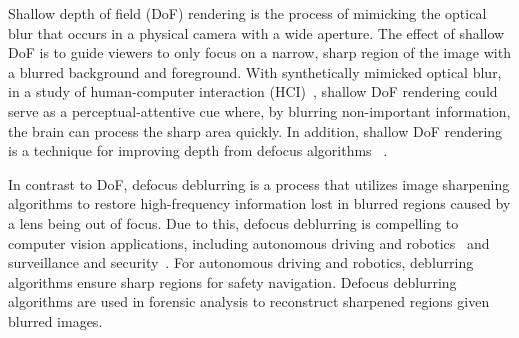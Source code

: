 Shallow depth of field (DoF) rendering is the process of mimicking the optical blur that occurs in a physical camera with a wide aperture. The effect of shallow DoF is to guide viewers to only focus on a narrow, sharp region of the image with a blurred background and foreground. With synthetically mimicked optical blur, in a study of human-computer interaction (HCI)~\cite{hillaire2008using}, shallow DoF rendering could serve as a perceptual-attentive cue where, by blurring non-important information, the brain can process the sharp area quickly. In addition, shallow DoF rendering is a technique for improving depth from defocus algorithms ~\cite{suwajanakorn2015depth}.




In contrast to DoF, defocus deblurring is a process that utilizes image sharpening algorithms to restore high-frequency information lost in blurred regions caused by a lens being out of focus. Due to this, defocus deblurring is compelling to computer vision applications, including autonomous driving and robotics~\cite{shah2025impact} and surveillance and security~\cite{hillaire2008using}. For autonomous driving and robotics, deblurring algorithms ensure sharp regions for safety navigation. Defocus deblurring algorithms are used in forensic analysis to reconstruct sharpened regions given blurred images.


